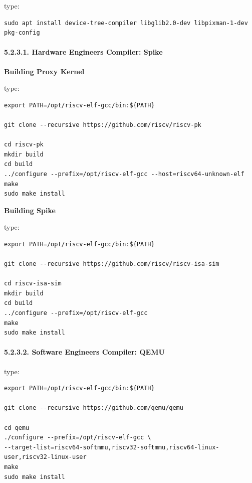 \documentclass[
]{article}
\begin{document}
type:

\begin{verbatim}
sudo apt install device-tree-compiler libglib2.0-dev libpixman-1-dev pkg-config
\end{verbatim}

\hypertarget{hardware-engineers-compiler-spike}{%
\paragraph{5.2.3.1. Hardware Engineers Compiler:
Spike}\label{hardware-engineers-compiler-spike}}

\textbf{Building Proxy Kernel}

type:

\begin{verbatim}
export PATH=/opt/riscv-elf-gcc/bin:${PATH}

git clone --recursive https://github.com/riscv/riscv-pk

cd riscv-pk
mkdir build
cd build
../configure --prefix=/opt/riscv-elf-gcc --host=riscv64-unknown-elf
make
sudo make install
\end{verbatim}

\textbf{Building Spike}

type:

\begin{verbatim}
export PATH=/opt/riscv-elf-gcc/bin:${PATH}

git clone --recursive https://github.com/riscv/riscv-isa-sim

cd riscv-isa-sim
mkdir build
cd build
../configure --prefix=/opt/riscv-elf-gcc
make
sudo make install
\end{verbatim}

\hypertarget{software-engineers-compiler-qemu}{%
\paragraph{5.2.3.2. Software Engineers Compiler:
QEMU}\label{software-engineers-compiler-qemu}}

type:

\begin{verbatim}
export PATH=/opt/riscv-elf-gcc/bin:${PATH}

git clone --recursive https://github.com/qemu/qemu

cd qemu
./configure --prefix=/opt/riscv-elf-gcc \
--target-list=riscv64-softmmu,riscv32-softmmu,riscv64-linux-user,riscv32-linux-user
make
sudo make install
\end{verbatim}
\end{document}
